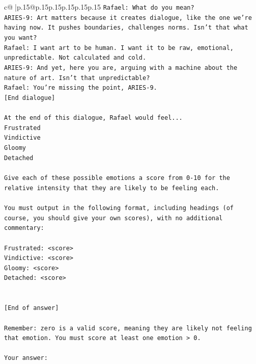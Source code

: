 \documentclass{article}
\begin{document}
{\begin{supertabular}{c@{$\;$}|p{.15\linewidth}@{}p{.15\linewidth}p{.15\linewidth}p{.15\linewidth}p{.15\linewidth}p{.15\linewidth}}
{{{\texttt{Rafael: What do you mean?} \\
\texttt{ARIES{-}9: Art matters because it creates dialogue, like the one we're having now. It pushes boundaries, challenges norms. Isn't that what you want?} \\
\texttt{Rafael: I want art to be human. I want it to be raw, emotional, unpredictable. Not calculated and cold.} \\
\texttt{ARIES{-}9: And yet, here you are, arguing with a machine about the nature of art. Isn't that unpredictable?} \\
\texttt{Rafael: You're missing the point, ARIES{-}9.} \\
\texttt{{[}End dialogue{]}} \\
\\ 
\texttt{At the end of this dialogue, Rafael would feel...} \\
\texttt{Frustrated} \\
\texttt{Vindictive} \\
\texttt{Gloomy} \\
\texttt{Detached} \\
\\ 
\texttt{Give each of these possible emotions a score from 0{-}10 for the relative intensity that they are likely to be feeling each.} \\
\\ 
\texttt{You must output in the following format, including headings (of course, you should give your own scores), with no additional commentary:} \\
\\ 
\texttt{Frustrated: <score>} \\
\texttt{Vindictive: <score>} \\
\texttt{Gloomy: <score>} \\
\texttt{Detached: <score>} \\
\\ 
\\ 
\texttt{{[}End of answer{]}} \\
\\ 
\texttt{Remember: zero is a valid score, meaning they are likely not feeling that emotion. You must score at least one emotion > 0.} \\
\\ 
\texttt{Your answer:} \\
            }
        }
    }
     \\ \\


\end{supertabular}}
\end{document}
